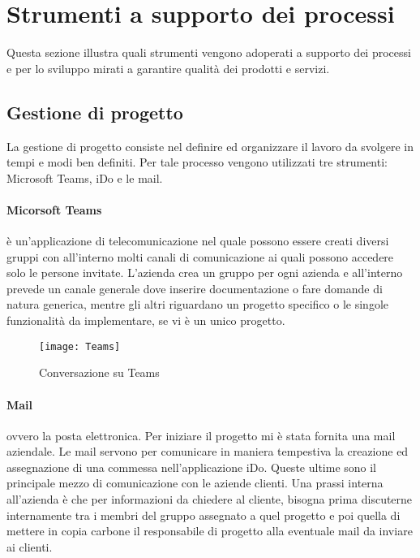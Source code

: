 \section{Strumenti a supporto dei processi}
\label{cap1:Strumenti a supporto dei processi}

Questa sezione illustra quali strumenti vengono adoperati a supporto dei processi e per lo sviluppo mirati a garantire qualità dei prodotti e servizi.

\subsection{Gestione di progetto}
\label{cap1:Gestione di progetto}

La gestione di progetto consiste nel definire ed organizzare il lavoro da svolgere in tempi e modi ben definiti. Per tale processo vengono utilizzati tre strumenti: Microsoft Teams, iDo e le mail.

\paragraph{Micorsoft Teams} è un'applicazione di telecomunicazione nel quale possono essere creati diversi gruppi con all'interno molti canali di comunicazione ai quali possono accedere solo le persone invitate. L'azienda crea un gruppo per ogni azienda e all'interno prevede un canale generale dove inserire documentazione o fare domande di natura generica, mentre gli altri riguardano un progetto specifico o le singole funzionalità da implementare, se vi è un unico progetto. 

\begin{figure}[!h] 
	\centering 
	\texttt{[image: Teams]} 
	\caption{Conversazione su Teams}
\end{figure}


\paragraph{Mail} ovvero la posta elettronica. Per iniziare il progetto mi è stata fornita una mail aziendale. Le mail servono per comunicare in maniera tempestiva la creazione ed assegnazione di una commessa nell'applicazione iDo. Queste ultime sono il principale mezzo di comunicazione con le aziende clienti. Una prassi interna all'azienda è che per informazioni da chiedere al cliente, bisogna prima discuterne internamente tra i membri del gruppo assegnato a quel progetto e poi quella di mettere in copia carbone il responsabile di progetto alla eventuale mail da inviare ai clienti.



